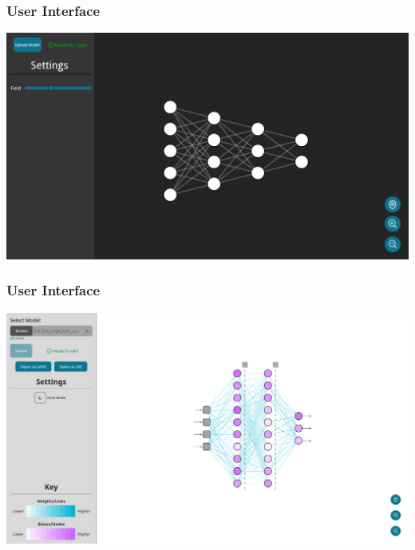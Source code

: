 \documentclass{beamer}
\begin{document}
\begin{frame}
    \frametitle{User Interface}
    \centering
    \includegraphics[scale=0.15]{../../docs/mockups/Main.png}
\end{frame}

\begin{frame}
    \frametitle{User Interface}
    \centering
    \includegraphics[scale=0.15]{../03_design/res/final_interface.png}
\end{frame}
\end{document}

